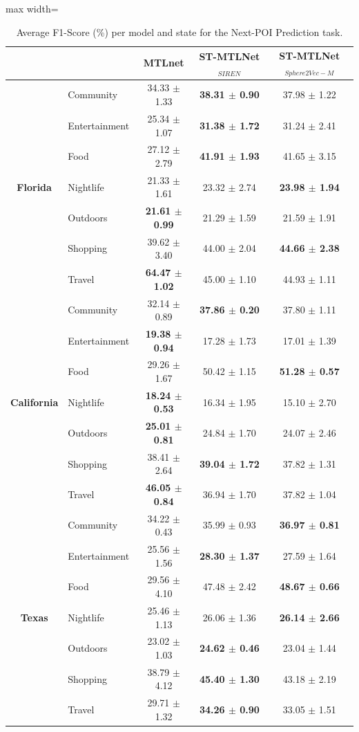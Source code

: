 \begin{table}[htbp]
\centering
\caption{Average F1-Score (\%) per model and state for the Next-POI Prediction task.}
\label{tab:courb:next}
\begin{adjustbox}{max width=\textwidth}
\begin{tabular}{clccc}
\toprule
 & & \textbf{MTLnet} & \textbf{ST-MTLNet$_{SIREN}$} & \textbf{ST-MTLNet$_{Sphere2Vec-M}$} \\
\midrule
\multirow{7}{*}{\textbf{Florida}} & Community & 34.33 $\pm$ 1.33 & \textbf{38.31 $\pm$ 0.90} & 37.98 $\pm$ 1.22 \\
 & Entertainment & 25.34 $\pm$ 1.07 & \textbf{31.38 $\pm$ 1.72} & 31.24 $\pm$ 2.41 \\
 & Food & 27.12 $\pm$ 2.79 & \textbf{41.91 $\pm$ 1.93} & 41.65 $\pm$ 3.15 \\
 & Nightlife & 21.33 $\pm$ 1.61 & 23.32 $\pm$ 2.74 & \textbf{23.98 $\pm$ 1.94} \\
 & Outdoors & \textbf{21.61 $\pm$ 0.99} & 21.29 $\pm$ 1.59 & 21.59 $\pm$ 1.91 \\
 & Shopping & 39.62 $\pm$ 3.40 & 44.00 $\pm$ 2.04 & \textbf{44.66 $\pm$ 2.38} \\
 & Travel & \textbf{64.47 $\pm$ 1.02} & 45.00 $\pm$ 1.10 & 44.93 $\pm$ 1.11 \\
\midrule
\multirow{7}{*}{\textbf{California}} & Community & 32.14 $\pm$ 0.89 & \textbf{37.86 $\pm$ 0.20} & 37.80 $\pm$ 1.11 \\
 & Entertainment & \textbf{19.38 $\pm$ 0.94} & 17.28 $\pm$ 1.73 & 17.01 $\pm$ 1.39 \\
 & Food & 29.26 $\pm$ 1.67 & 50.42 $\pm$ 1.15 & \textbf{51.28 $\pm$ 0.57} \\
 & Nightlife & \textbf{18.24 $\pm$ 0.53} & 16.34 $\pm$ 1.95 & 15.10 $\pm$ 2.70 \\
 & Outdoors & \textbf{25.01 $\pm$ 0.81} & 24.84 $\pm$ 1.70 & 24.07 $\pm$ 2.46 \\
 & Shopping & 38.41 $\pm$ 2.64 & \textbf{39.04 $\pm$ 1.72} & 37.82 $\pm$ 1.31 \\
 & Travel & \textbf{46.05 $\pm$ 0.84} & 36.94 $\pm$ 1.70 & 37.82 $\pm$ 1.04 \\
\midrule
\multirow{7}{*}{\textbf{Texas}} & Community & 34.22 $\pm$ 0.43 & 35.99 $\pm$ 0.93 & \textbf{36.97 $\pm$ 0.81} \\
 & Entertainment & 25.56 $\pm$ 1.56 & \textbf{28.30 $\pm$ 1.37} & 27.59 $\pm$ 1.64 \\
 & Food & 29.56 $\pm$ 4.10 & 47.48 $\pm$ 2.42 & \textbf{48.67 $\pm$ 0.66} \\
 & Nightlife & 25.46 $\pm$ 1.13 & 26.06 $\pm$ 1.36 & \textbf{26.14 $\pm$ 2.66} \\
 & Outdoors & 23.02 $\pm$ 1.03 & \textbf{24.62 $\pm$ 0.46} & 23.04 $\pm$ 1.44 \\
 & Shopping & 38.79 $\pm$ 4.12 & \textbf{45.40 $\pm$ 1.30} & 43.18 $\pm$ 2.19 \\
 & Travel & 29.71 $\pm$ 1.32 & \textbf{34.26 $\pm$ 0.90} & 33.05 $\pm$ 1.51 \\
\bottomrule
\end{tabular}
\end{adjustbox}
\end{table}
